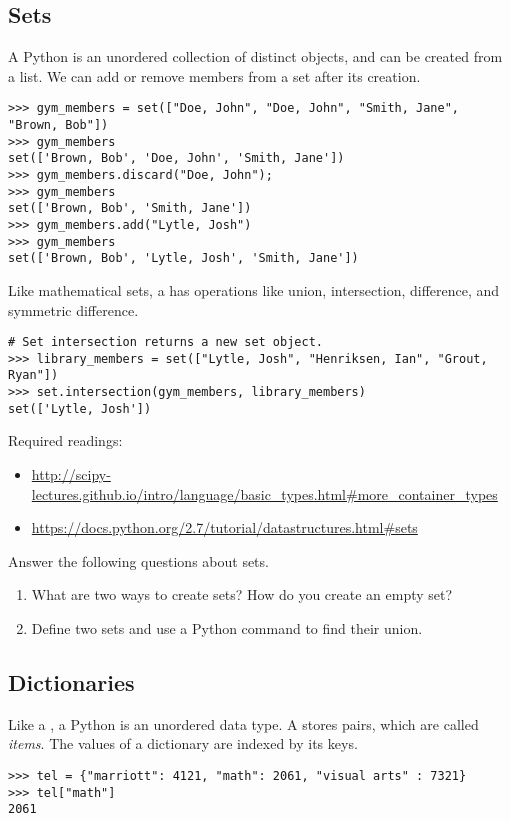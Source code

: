 \subsection*{Sets}
A Python  is an unordered collection of distinct objects, and can be created from a list. We can add or remove members from a set after its creation.
\begin{lstlisting}
>>> gym_members = set(["Doe, John", "Doe, John", "Smith, Jane", "Brown, Bob"])
>>> gym_members
set(['Brown, Bob', 'Doe, John', 'Smith, Jane'])
>>> gym_members.discard("Doe, John");
>>> gym_members
set(['Brown, Bob', 'Smith, Jane'])
>>> gym_members.add("Lytle, Josh")
>>> gym_members
set(['Brown, Bob', 'Lytle, Josh', 'Smith, Jane'])
\end{lstlisting}

Like mathematical sets, a  has operations like union, intersection, 
difference, and symmetric difference.

\begin{lstlisting}
# Set intersection returns a new set object.
>>> library_members = set(["Lytle, Josh", "Henriksen, Ian", "Grout, Ryan"])
>>> set.intersection(gym_members, library_members)
set(['Lytle, Josh'])
\end{lstlisting}

Required readings: 
\begin{itemize}
\item \url{http://scipy-lectures.github.io/intro/language/basic_types.html#more_container_types}
\item \url{https://docs.python.org/2.7/tutorial/datastructures.html#sets}
\end{itemize}

\begin{problem}
Answer the following questions about sets.
\begin{enumerate}
\item What are two ways to create sets? How do you create an empty set?
\item Define two sets and use a Python command to find their union.
\end{enumerate}
\end{problem}

\subsection*{Dictionaries}
Like a , a Python  is an unordered data type.  A  stores  pairs, which are called \emph{items}. The values of a dictionary are indexed by its keys.
\begin{lstlisting}
>>> tel = {"marriott": 4121, "math": 2061, "visual arts" : 7321} 
>>> tel["math"]
2061
\end{lstlisting}

